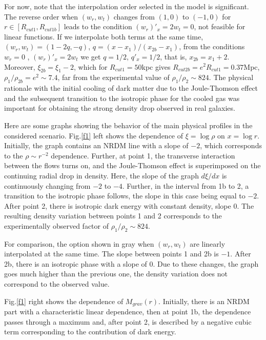 \documentclass{article}
\begin{document}
For now, note that the interpolation order selected in the model is significant. The reverse order when $ (w_r, w_t) $ changes from $ (1,0) $ to $ (- 1,0) $ for $ r \in [R_ {cut1}, R_ {cut1b}] $ leads to the condition $ (w_r) '_ x = 2w_t = 0 $, not feasible for linear functions. If we interpolate both terms at the same time, $ (w_r, w_t) = (1-2q, -q) $, $ q = (x-x_1) / (x_ {2b} -x_1) $, from the conditions $ w_r = 0 $ , $ (w_r) '_ x = 2w_t $ we get $ q = 1/2 $, $ q'_x = 1/2 $, that is, $ x_ {2b} = x_1 + 2 $. Moreover, $ \xi_ {2b} = \xi_1-2 $, which for $ R_ {cut1} = 50 $kpc gives $ R_ {cut2b} = e ^ 2R_ {cut1} = 0.37 $Mpc, $ \rho_1 / \rho_ {2b} = e ^ 2 \sim7.4 $, far from the experimental value of $ \rho_1 / \rho_2 \sim824 $. The physical rationale with the initial cooling of dark matter due to the Joule-Thomson effect and the subsequent transition to the isotropic phase for the cooled gas was important for obtaining the strong density drop observed in real galaxies.

Here are some graphs showing the behavior of the main physical profiles in the considered scenario. Fig.\ref {f1} left shows the dependence of $ \xi = \log \rho $ on $ x = \log r $. Initially, the graph contains an NRDM line with a slope of $ -2 $, which corresponds to the $ \rho \sim r ^ {- 2} $ dependence. Further, at point 1, the transverse interaction between the flows turns on, and the Joule-Thomson effect is superimposed on the continuing radial drop in density. Here, the slope of the graph $ d \xi / dx $ is continuously changing from $ -2 $ to $ -4 $. Further, in the interval from 1b to 2, a transition to the isotropic phase follows, the slope in this case being equal to $ -2 $. After point 2, there is isotropic dark energy with constant density, slope $ 0 $. The resulting density variation between points 1 and 2 corresponds to the experimentally observed factor of $ \rho_1 / \rho_2 \sim824 $.

For comparison, the option shown in gray when $ (w_r, w_t) $ are linearly interpolated at the same time. The slope between points 1 and 2b is $ -1 $. After 2b, there is an isotropic phase with a slope of $ 0 $. Due to these changes, the graph goes much higher than the previous one, the density variation does not correspond to the observed value.

Fig.\ref {f1} right shows the dependence of $ M_ {grav} (r) $. Initially, there is an NRDM part with a characteristic linear dependence, then at point 1b, the dependence passes through a maximum and, after point 2, is described by a negative cubic term corresponding to the contribution of dark energy. 
\end{document}
